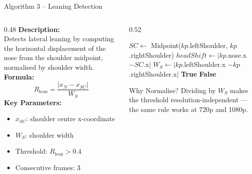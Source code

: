 \documentclass{beamer}
\begin{document}
\begin{frame}{Algorithm 3 -- Leaning Detection}
\begin{columns}
\begin{column}{0.48\textwidth}
\footnotesize
\textbf{Description:}\\
Detects lateral leaning by computing the horizontal displacement of the nose from the shoulder midpoint, normalised by shoulder width.\\[0.3cm]
\textbf{Formula:}
\[
R_{\text{lean}} = \frac{|x_N - x_{SC}|}{W_S}
\]
\textbf{Key Parameters:}
\begin{itemize}\footnotesize
    \item $x_{SC}$: shoulder centre x-coordinate
    \item $W_S$: shoulder width
    \item Threshold: $R_{\text{lean}} > 0.4$
    \item Consecutive frames: 3
\end{itemize}
\end{column}
\begin{column}{0.52\textwidth}
\begin{algorithmic}[1]
\footnotesize
{}
  \State $SC \gets$ Midpoint($kp$.leftShoulder, $kp$.rightShoulder)
  \State $headShift \gets |kp$.nose.x $- SC$.x$|$
  \State $W_S \gets |kp$.leftShoulder.x $- kp$.rightShoulder.x$|$
    \State \Return \textbf{True}
  \EndIf
  \State \Return \textbf{False}
\EndFunction
\end{algorithmic}
\vspace{0.4cm}
\begin{exampleblock}{\footnotesize Why Normalise?}
\footnotesize Dividing by $W_S$ makes the threshold resolution-independent --- the same rule works at 720p and 1080p.
\end{exampleblock}
\end{column}
\end{columns}
\end{frame}
\end{document}
